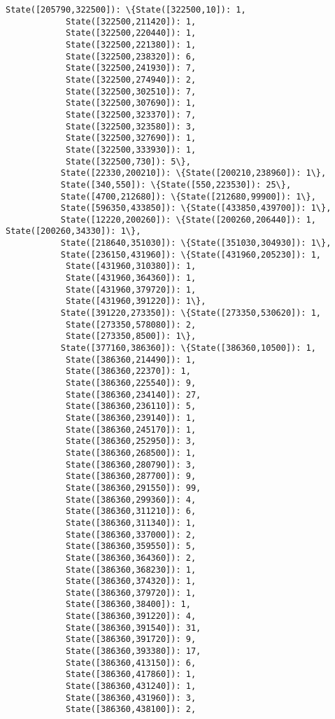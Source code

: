 \documentclass[11pt]{article}
\begin{document}
\begin{Verbatim}[commandchars=\\\{\}]
           State([205790,322500]): \{State([322500,10]): 1,
            State([322500,211420]): 1,
            State([322500,220440]): 1,
            State([322500,221380]): 1,
            State([322500,238320]): 6,
            State([322500,241930]): 7,
            State([322500,274940]): 2,
            State([322500,302510]): 7,
            State([322500,307690]): 1,
            State([322500,323370]): 7,
            State([322500,323580]): 3,
            State([322500,327690]): 1,
            State([322500,333930]): 1,
            State([322500,730]): 5\},
           State([22330,200210]): \{State([200210,238960]): 1\},
           State([340,550]): \{State([550,223530]): 25\},
           State([4700,212680]): \{State([212680,99900]): 1\},
           State([596350,433850]): \{State([433850,439700]): 1\},
           State([12220,200260]): \{State([200260,206440]): 1, State([200260,34330]): 1\},
           State([218640,351030]): \{State([351030,304930]): 1\},
           State([236150,431960]): \{State([431960,205230]): 1,
            State([431960,310380]): 1,
            State([431960,364360]): 1,
            State([431960,379720]): 1,
            State([431960,391220]): 1\},
           State([391220,273350]): \{State([273350,530620]): 1,
            State([273350,578080]): 2,
            State([273350,8500]): 1\},
           State([377160,386360]): \{State([386360,10500]): 1,
            State([386360,214490]): 1,
            State([386360,22370]): 1,
            State([386360,225540]): 9,
            State([386360,234140]): 27,
            State([386360,236110]): 5,
            State([386360,239140]): 1,
            State([386360,245170]): 1,
            State([386360,252950]): 3,
            State([386360,268500]): 1,
            State([386360,280790]): 3,
            State([386360,287700]): 9,
            State([386360,291550]): 99,
            State([386360,299360]): 4,
            State([386360,311210]): 6,
            State([386360,311340]): 1,
            State([386360,337000]): 2,
            State([386360,359550]): 5,
            State([386360,364360]): 2,
            State([386360,368230]): 1,
            State([386360,374320]): 1,
            State([386360,379720]): 1,
            State([386360,38400]): 1,
            State([386360,391220]): 4,
            State([386360,391540]): 31,
            State([386360,391720]): 9,
            State([386360,393380]): 17,
            State([386360,413150]): 6,
            State([386360,417860]): 1,
            State([386360,431240]): 1,
            State([386360,431960]): 3,
            State([386360,438100]): 2,

\end{Verbatim}
\end{document}
